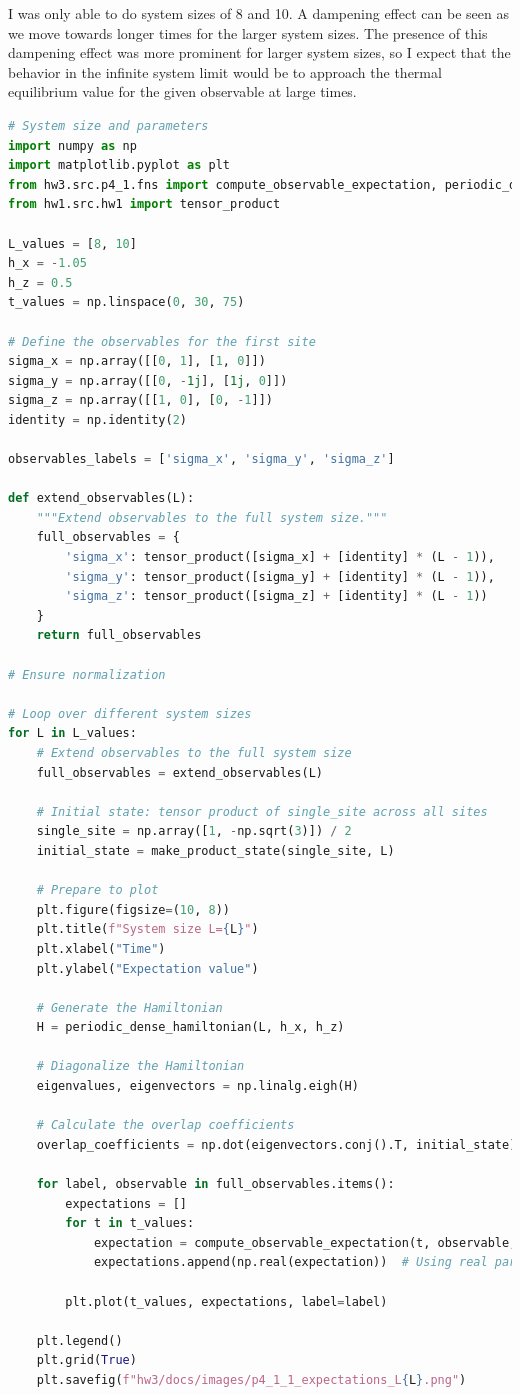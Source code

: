 \documentclass[12pt]{article}
\begin{document}
I was only able to do system sizes of 8 and 10. A dampening effect can be seen as we move towards longer times for the larger system sizes. The presence of this dampening effect was more prominent for larger system sizes, so I expect that the behavior in the infinite system limit would be to approach the thermal equilibrium value for the given observable at large times.
\begin{lstlisting}[language=Python]
# System size and parameters
import numpy as np
import matplotlib.pyplot as plt
from hw3.src.p4_1.fns import compute_observable_expectation, periodic_dense_hamiltonian, make_product_state
from hw1.src.hw1 import tensor_product

L_values = [8, 10]
h_x = -1.05
h_z = 0.5
t_values = np.linspace(0, 30, 75)

# Define the observables for the first site
sigma_x = np.array([[0, 1], [1, 0]])
sigma_y = np.array([[0, -1j], [1j, 0]])
sigma_z = np.array([[1, 0], [0, -1]])
identity = np.identity(2)

observables_labels = ['sigma_x', 'sigma_y', 'sigma_z']

def extend_observables(L):
    """Extend observables to the full system size."""
    full_observables = {
        'sigma_x': tensor_product([sigma_x] + [identity] * (L - 1)),
        'sigma_y': tensor_product([sigma_y] + [identity] * (L - 1)),
        'sigma_z': tensor_product([sigma_z] + [identity] * (L - 1))
    }
    return full_observables

# Ensure normalization

# Loop over different system sizes
for L in L_values:
    # Extend observables to the full system size
    full_observables = extend_observables(L)

    # Initial state: tensor product of single_site across all sites
    single_site = np.array([1, -np.sqrt(3)]) / 2
    initial_state = make_product_state(single_site, L)

    # Prepare to plot
    plt.figure(figsize=(10, 8))
    plt.title(f"System size L={L}")
    plt.xlabel("Time")
    plt.ylabel("Expectation value")

    # Generate the Hamiltonian
    H = periodic_dense_hamiltonian(L, h_x, h_z)

    # Diagonalize the Hamiltonian
    eigenvalues, eigenvectors = np.linalg.eigh(H)

    # Calculate the overlap coefficients
    overlap_coefficients = np.dot(eigenvectors.conj().T, initial_state)

    for label, observable in full_observables.items():
        expectations = []
        for t in t_values:
            expectation = compute_observable_expectation(t, observable, overlap_coefficients, eigenvalues, eigenvectors)
            expectations.append(np.real(expectation))  # Using real part; adjust if needed

        plt.plot(t_values, expectations, label=label)

    plt.legend()
    plt.grid(True)
    plt.savefig(f"hw3/docs/images/p4_1_1_expectations_L{L}.png")

\end{lstlisting}
\end{document}
